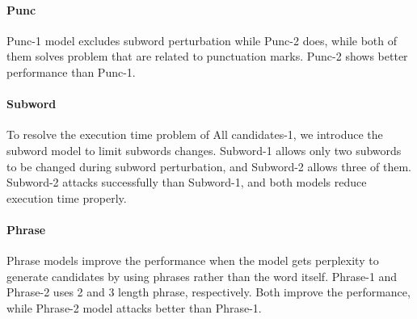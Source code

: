 \documentclass[11pt,a4paper]{article}
\begin{document}
\paragraph{Punc}
Punc-1 model excludes subword perturbation while Punc-2 does, while both of them solves problem that are related to punctuation marks. Punc-2 shows better performance than Punc-1.

\paragraph{Subword}
To resolve the execution time problem of All candidates-1, we introduce the subword model to limit subwords changes.
Subword-1 allows only two subwords to be changed during subword perturbation, and Subword-2 allows three of them.
Subword-2 attacks successfully than Subword-1, and both models reduce execution time properly.

\paragraph{Phrase}
Phrase models improve the performance when the model gets perplexity to generate candidates by using phrases rather than the word itself.
Phrase-1 and Phrase-2 uses 2 and 3 length phrase, respectively. Both improve the performance, while Phrase-2 model attacks better than Phrase-1.
\end{document}
